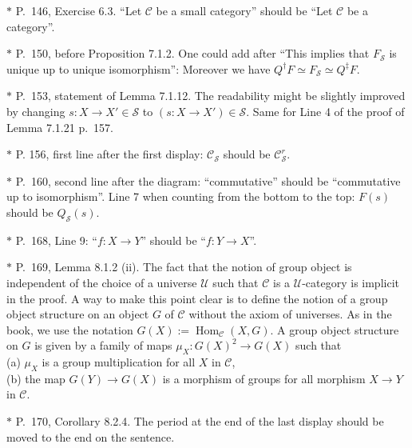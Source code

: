 \documentclass[12pt]{article}
\theoremstyle{remark}
\theoremstyle{definition}
\newcommand{\cc}{\mathcal}
\newcommand{\C}{\mathcal C}
\newcommand{\SSS}{\mathcal S}
\newcommand{\U}{\mathcal U}
\DeclareMathOperator{\Hom}{Hom}%
\begin{document}
\noindent $*$ P.~146, Exercise 6.3. ``Let $\C$ be a small category'' should be ``Let $\C$ be a category''.

\noindent $*$ P.~150, before Proposition 7.1.2. One could add after ``This implies that $F_{\SSS}$ is unique up to unique isomorphism'': Moreover we have $Q^\dagger F\simeq F_{\SSS}\simeq Q^\ddagger F$.

\noindent $*$ P.~153, statement of Lemma 7.1.12. The readability might be slightly improved by changing $s:X\to X'\in\mathcal S$ to $(s:X\to X')\in\mathcal S$. Same for Line 4 of the proof of Lemma 7.1.21 p.~157.

\noindent $*$ P. 156, first line after the first display: $\C_{\cc S}$ should be $\C_{\cc S}^r$.

\noindent $*$ P.~160, second line after the diagram: ``commutative'' should be ``commutative up to isomorphism''. Line 7 when counting from the bottom to the top: $F(s)$ should be $Q_{\mathcal S}(s)$.

\noindent $*$ P.~168, Line 9: ``$f:X\to Y$'' should be ``$f:Y\to X$''.

\noindent $*$ P.~169, Lemma 8.1.2 (ii). The fact that the notion of group object is independent of the choice of a universe $\U$ such that $\C$ is a $\U$-category is implicit in the proof. A way to make this point clear is to define the notion of a group object structure on an object $G$ of $\C$ without the axiom of universes. As in the book, we use the notation $G(X):=\Hom_\C(X,G)$. A group object structure on $G$ is given by a family of maps $\mu_X:G(X)^2\to G(X)$ such that\\ 
\noindent(a) $\mu_X$ is a group multiplication for all $X$ in $\C$,\\ 
\noindent(b) the map $G(Y)\to G(X)$ is a morphism of groups for all morphism $X\to Y$ in $\C$.


\noindent $*$ P.~170, Corollary 8.2.4. The period at the end of the last display should be moved to the end on the sentence.
\end{document}
